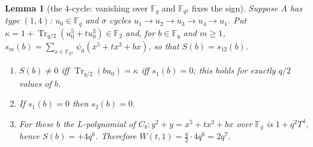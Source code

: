 \documentclass[11pt,a4paper]{amsart}
\newtheorem{lemma}[theorem]{Lemma}
\theoremstyle{definition}
\newcommand{\F}{\mathbb{F}}
\newcommand{\Tr}{\operatorname{Tr}}
\begin{document}
\begin{lemma}[the $4$-cycle: vanishing over $\F_q$ and $\F_{q^2}$ fixes the sign]\label{lem:fourcycle}
Suppose $A$ has type $(1,4)$: $u_0\in\F_q$ and $\sigma$ cycles $u_1\to u_2\to u_3\to u_4\to u_1$. Put $\kappa=1+\Tr_{q/2}(u_0^5+tu_0^3)\in\F_2$ and, for $b\in\F_q$ and $m\ge1$, $s_m(b)=\sum_{x\in\F_{q^m}}\psi_0(x^5+tx^3+bx)$, so that $S(b)=s_{12}(b)$.
\begin{enumerate}[label=\textup{(\alph*)},leftmargin=2em]
\item $S(b)\ne0$ iff $\Tr_{q/2}(bu_0)=\kappa$ iff $s_1(b)=0$; this holds for exactly $q/2$ values of $b$.
\item If $s_1(b)=0$ then $s_2(b)=0$.
\item For these $b$ the $L$-polynomial of $C_b:y^2+y=x^5+tx^3+bx$ over $\F_q$ is $1+q^2T^4$, hence $S(b)=+4q^6$. Therefore $W(t,1)=\frac q2\cdot4q^6=2q^7$.
\end{enumerate}
\end{lemma}
\end{document}
